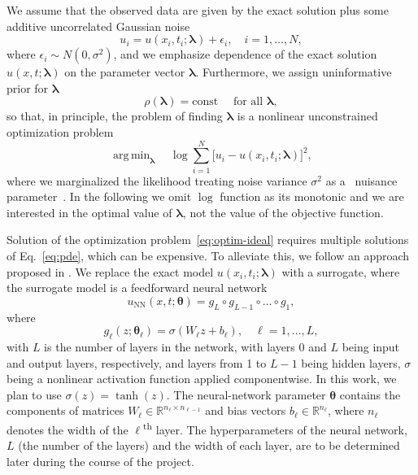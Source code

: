 \documentclass[a4paper, 12pt, parskip]{scrartcl}
\renewcommand{\vec}[1]{\boldsymbol{#1}}
\newcommand{\VTheta}{\ensuremath{\vec{\theta}}}
\newcommand{\VLambda}{\ensuremath{\vec{\lambda}}}
\DeclareMathOperator*{\argmin}{arg\,min}
\newcommand{\R}{\mathbb R}
\newcommand{\UNN}[1][\text{NN}]{u_{#1}}
\begin{document}
We assume that the observed data are given by the exact solution plus some
additive uncorrelated Gaussian noise
\begin{equation}
    u_i = u(x_i, t_i; \VLambda) + \epsilon_i, \quad i=1, \dots, N,
\end{equation}
where $\epsilon_i \sim N(0, \sigma^2)$, and we emphasize dependence of the exact
solution $u(x, t; \VLambda)$ on the parameter vector $\VLambda$.
Furthermore, we assign uninformative prior for $\VLambda$
\begin{equation}
    \rho(\vec{\lambda}) = \text{const} \quad \text{ for all } \vec{\lambda},
\end{equation}
so that, in principle,
the problem of finding $\VLambda$ is a nonlinear unconstrained
optimization problem
\begin{equation}
    \label{eq:optim-ideal}
    \argmin_{\VLambda} \quad 
    \log \sum_{i=1}^{N} \big[ u_i - u(x_i, t_i; \VLambda) \big]^2,
\end{equation}
where we marginalized the likelihood treating noise variance $\sigma^2$ as a~
nuisance parameter~\cite[section~8.2]{sivia2006data}. In the following we omit
$\log$ function as its monotonic and we are interested in the optimal value of
$\VLambda$, not the value of the objective function.

Solution of the optimization problem~\eqref{eq:optim-ideal} requires multiple
solutions of Eq.~\eqref{eq:pde}, which can be expensive.
To alleviate this, we follow an approach proposed in \cite{raissi2017pinnII}.
We replace the exact
model $u(x_i, t_i; \VLambda)$ with a surrogate, where the surrogate model is a
feedforward neural network \cite{goodfellow2016deep}
\begin{equation}
\UNN(x, t; \vec{\theta}) = g_L \circ g_{L-1} \circ \dots \circ g_1,
\end{equation}
where
\[
    g_\ell(z; \VTheta_\ell) = \sigma (W_\ell z + b_\ell), \quad \ell = 1,\dots,L,
\]
with $L$ is the number of layers in the network, with layers 0 and $L$ being
input and output layers, respectively, and layers from 1 to $L-1$ being hidden
layers, $\sigma$ being a nonlinear activation function applied
componentwise. In this work, we plan to use \( \sigma(z) = \tanh (z) \).
The neural-network parameter $\VTheta$ contains the components of matrices
$W_\ell \in \R^{n_{\ell}\times n_{\ell-1}}$ and bias vectors
$b_\ell \in \R^{n_\ell}$, where $n_\ell$ denotes the width of the
$\ell$\textsuperscript{th} layer.
The hyperparameters of the neural network, $L$ (the number of the layers) and
the width of each layer, are to be determined later during the course of the
project.
\end{document}
